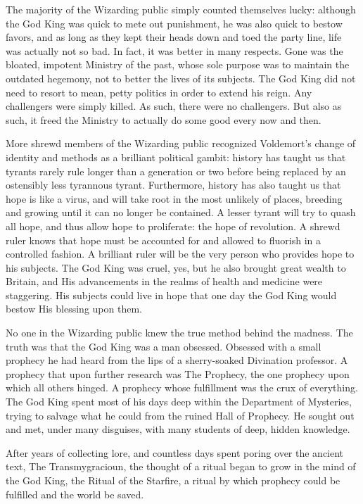 The majority of the Wizarding public simply counted themselves lucky: although the God King was quick to mete out punishment, he was also quick to bestow favors, and as long as they kept their heads down and toed the party line, life was actually not so bad. In fact, it was better in many respects. Gone was the bloated, impotent Ministry of the past, whose sole purpose was to maintain the outdated hegemony, not to better the lives of its subjects. The God King did not need to resort to mean, petty politics in order to extend his reign. Any challengers were simply killed. As such, there were no challengers. But also as such, it freed the Ministry to actually do some good every now and then.

More shrewd members of the Wizarding public recognized Voldemort’s change of identity and methods as a brilliant political gambit: history has taught us that tyrants rarely rule longer than a generation or two before being replaced by an ostensibly less tyrannous tyrant. Furthermore, history has also taught us that hope is like a virus, and will take root in the most unlikely of places, breeding and growing until it can no longer be contained. A lesser tyrant will try to quash all hope, and thus allow hope to proliferate: the hope of revolution. A shrewd ruler knows that hope must be accounted for and allowed to fluorish in a controlled fashion. A brilliant ruler will be the very person who provides hope to his subjects. The God King was cruel, yes, but he also brought great wealth to Britain, and His advancements in the realms of health and medicine were staggering. His subjects could live in hope that one day the God King would bestow His blessing upon them.

No one in the Wizarding public knew the true method behind the madness. The truth was that the God King was a man obsessed. Obsessed with a small prophecy he had heard from the lips of a sherry-soaked Divination professor. A prophecy that upon further research was The Prophecy, the one prophecy upon which all others hinged. A prophecy whose fulfillment was the crux of everything. The God King spent most of his days deep within the Department of Mysteries, trying to salvage what he could from the ruined Hall of Prophecy. He sought out and met, under many disguises, with many students of deep, hidden knowledge.

After years of collecting lore, and countless days spent poring over the ancient text, The Transmygracioun, the thought of a ritual began to grow in the mind of the God King, the Ritual of the Starfire, a ritual by which prophecy could be fulfilled and the world be saved.


